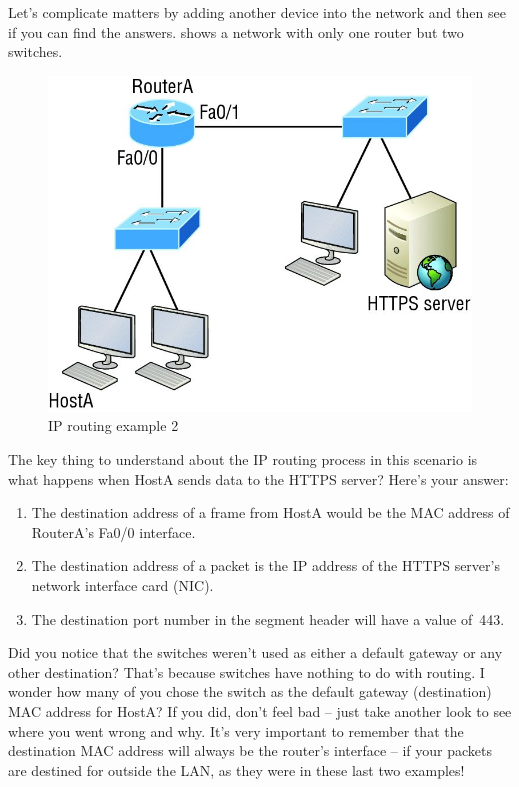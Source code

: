 Let's complicate matters by adding another device into the network and
then see if you can find the answers.
 shows a network with only one router but two switches.


\begin{figure}
   \centering
   \includegraphics{images/c09f005.jpg}
   \caption{IP routing example 2}
   \label{fig:ip-routing-ex-2}
\end{figure}


The key thing to understand about the IP routing process in this scenario is what happens when HostA sends data to the HTTPS server? Here's your answer:

\begin{enumerate}
\item
   The destination address of a frame from HostA would be the MAC address of RouterA's Fa0/0 interface.
\item
   The destination address of a packet is the IP address of the HTTPS server's network interface card (NIC).
\item
   The destination port number in the segment header will have a value of~443.
\end{enumerate}

Did you notice that the switches weren't used as either a default
gateway or any other destination? That's because switches have nothing
to do with routing. I wonder how many of you chose the switch as the
default gateway (destination) MAC address for HostA? If you did, don't
feel bad -- just take another look to see where you went wrong and why.
It's very important to remember that the destination MAC address will
always be the router's interface -- if your packets are destined for
outside the LAN, as they were in these last two examples!


